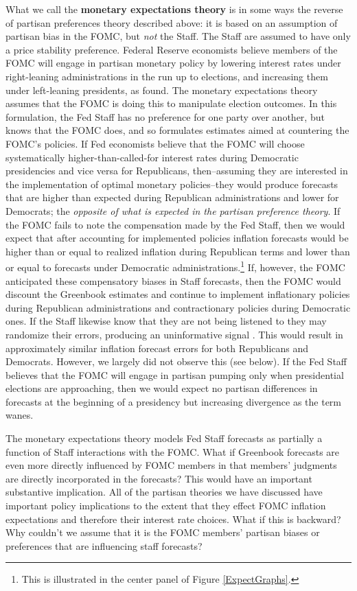 \documentclass[a4paper]{article}\usepackage[]{graphicx}\usepackage[]{color}
\begin{document}
What we call the {\bf{monetary expectations theory}} is in some ways the reverse of partisan preferences theory described above: it is based on an assumption of partisan bias in the FOMC, but {\emph{not}} the Staff. The Staff are assumed to have only a price stability preference. Federal Reserve economists believe members of the FOMC will engage in partisan monetary policy by lowering interest rates under right-leaning administrations in the run up to elections, and increasing them under left-leaning presidents, as \cite{Clark2012} found. The monetary expectations theory assumes that the FOMC is doing this to manipulate election outcomes. In this formulation, the Fed Staff has no preference for one party over another, but knows that the FOMC does, and so formulates estimates aimed at countering the FOMC's policies. If Fed economists believe that the FOMC will choose systematically higher-than-called-for interest rates during Democratic presidencies and vice versa for Republicans, then--assuming they are interested in the implementation of optimal monetary policies--they would produce forecasts that are higher than expected during Republican administrations and lower for Democrats; the {\emph{opposite of what is expected in the partisan preference theory}}. If the FOMC fails to note the compensation made by the Fed Staff, then we would expect that after accounting for implemented policies inflation forecasts would be higher than or equal to realized inflation during Republican terms and lower than or equal to forecasts under Democratic administrations.\footnote{This is illustrated in the center panel of Figure \ref{ExpectGraphs}.} If, however, the FOMC anticipated these compensatory biases in Staff forecasts, then the FOMC would discount the Greenbook estimates and continue to implement inflationary policies during Republican administrations and contractionary policies during Democratic ones. If the Staff likewise know that they are not being listened to they may randomize their errors, producing an uninformative signal \citep{Crawford1982}. This would result in approximately similar inflation forecast errors for both Republicans and Democrats. However, we largely did not observe this (see below). If the Fed Staff believes that the FOMC will engage in partisan pumping only when presidential elections are approaching, then we would expect no partisan differences in forecasts at the beginning of a presidency but increasing divergence as the term wanes.

The monetary expectations theory models Fed Staff forecasts as partially a function of Staff interactions with the FOMC. What if Greenbook forecasts are even more directly influenced by FOMC members in that members' judgments are directly incorporated in the forecasts? This would have an important substantive implication. All of the partisan theories we have discussed have important policy implications to the extent that they effect FOMC inflation expectations and therefore their interest rate choices. What if this is backward? Why couldn't we assume that it is the FOMC members' partisan biases or preferences that are influencing staff forecasts? 
\end{document}
